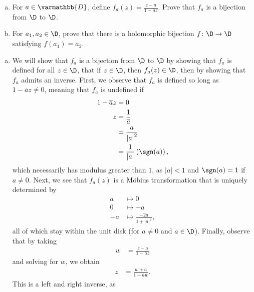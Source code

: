 \documentclass[10pt]{mypackage}
\renewcommand*{\mathbb}[1]{\varmathbb{#1}}
\begin{document}
\begin{problem}[Problem 6]\hfill
  \begin{enumerate}[(a)]
    \item For $a\in \mathbb{D}$, define $f_a(z) = \frac{z-a}{1- \overline{a}z}$. Prove that $f_a$ is a bijection from $\D$ to $\D$.
    \item For $a_1,a_2\in \D$, prove that there is a holomorphic bijection $f\colon \D\rightarrow \D$ satisfying $f\left( a_1 \right) = a_2$.
  \end{enumerate}
\end{problem}
\begin{solution}\hfill
  \begin{enumerate}[(a)]
    \item We will show that $f_a$ is a bijection from $\D$ to $\D$ by showing that $f_a$ is defined for all $z\in \D$, that if $z\in \D$, then $f_a(z) \in \D$, then by showing that $f_a$ admits an inverse. First, we observe that $f_a$ is defined so long as $1- \overline{a}z \neq 0$, meaning that $f_a$ is undefined if
      \begin{align*}
        1- \overline{a}z &= 0\\
        z &= \frac{1}{ \overline{a} }\\
          &= \frac{a}{\left\vert a \right\vert^2}\\
          &= \frac{1}{\left\vert a \right\vert} \left( \sgn(a) \right),
      \end{align*}
      which necessarily has modulus greater than $1$, as $\left\vert a \right\vert < 1$ and $\sgn(a) = 1$ if $a \neq 0$. Next, we see that $f_a(z)$ is a Möbius transformation that is uniquely determined by
      \begin{align*}
        a &\mapsto 0\\
        0 &\mapsto -a\\
        -a &\mapsto \frac{-2a}{1 + \left\vert a \right\vert^2},
      \end{align*}
      all of which stay within the unit disk (for $a\neq 0$ and $a\in \D$). Finally, observe that by taking
      \begin{align*}
        w &= \frac{z-a}{1- \overline{a}z}
      \end{align*}
      and solving for $w$, we obtain
      \begin{align*}
        z &= \frac{w+a}{1 + \overline{a}w}.
      \end{align*}
      This is a left and right inverse, as
      \begin{align*}

\end{align*}
\end{enumerate}
\end{solution}
\end{document}

